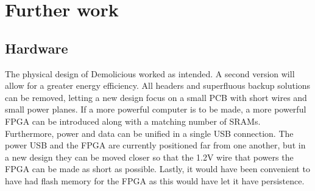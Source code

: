 \documentclass[../main/report.tex]{subfiles}
\begin{document}
\section{Further work}

\subsection{Hardware}
The physical design of Demolicious worked as intended.
A second version will allow for a greater energy efficiency.
All headers and superfluous backup solutions can be removed, letting a new design focus on a small PCB with short wires and small power planes.
If a more powerful computer is to be made, a more powerful FPGA can be introduced along with a matching number of SRAMs.
Furthermore, power and data can be unified in a single USB connection.
The power USB and the FPGA are currently positioned far from one another, but in a new design they can be moved closer so that the 1.2V wire that powers the FPGA can be made as short as possible.
Lastly, it would have been convenient to have had flash memory for the FPGA as this would have let it have persistence.  
\end{document}
